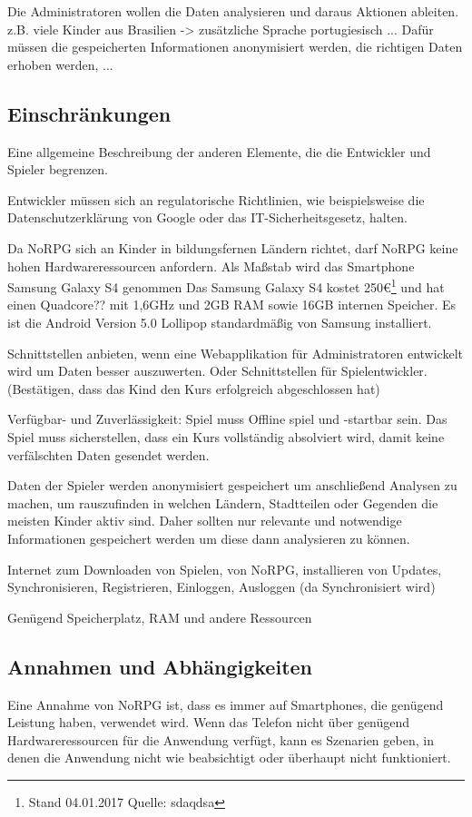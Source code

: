 		Die Administratoren wollen die Daten analysieren und daraus Aktionen ableiten. z.B. viele Kinder aus Brasilien -> zusätzliche Sprache portugiesisch ... Dafür müssen die gespeicherten Informationen anonymisiert werden, die richtigen Daten erhoben werden, ...
			
	\subsection{Einschränkungen}
		Eine allgemeine Beschreibung der anderen Elemente, die die Entwickler und Spieler begrenzen.
		
		Entwickler müssen sich an regulatorische Richtlinien, wie beispielsweise die Datenschutzerklärung von Google oder das IT-Sicherheitsgesetz, halten.
				
		Da NoRPG sich an Kinder in bildungsfernen Ländern richtet, darf NoRPG keine hohen Hardwareressourcen anfordern. Als Maßstab wird das Smartphone Samsung Galaxy S4 genommen %
		Das Samsung Galaxy S4 kostet 250€\footnote{Stand 04.01.2017 Quelle: sdaqdsa} und hat einen Quadcore?? mit 1,6GHz und 2GB RAM sowie 16GB internen Speicher. Es ist die Android Version 5.0 Lollipop standardmäßig von Samsung installiert.
		
		Schnittstellen anbieten, wenn eine Webapplikation für Administratoren entwickelt wird um Daten besser auszuwerten. Oder Schnittstellen für Spielentwickler. (Bestätigen, dass das Kind den Kurs erfolgreich abgeschlossen hat)
				
		Verfügbar- und Zuverlässigkeit: Spiel muss Offline spiel und -startbar sein. Das Spiel muss sicherstellen, dass ein Kurs vollständig absolviert wird, damit keine verfälschten Daten gesendet werden. 

		Daten der Spieler werden anonymisiert gespeichert um anschließend Analysen zu machen, um rauszufinden in welchen Ländern, Stadtteilen oder Gegenden die meisten Kinder aktiv sind. Daher sollten nur relevante und notwendige Informationen gespeichert werden um diese dann analysieren zu können.
		
		Internet zum Downloaden von Spielen, von NoRPG, installieren von Updates, Synchronisieren, Registrieren, Einloggen, Ausloggen (da Synchronisiert wird) 
		
		Genügend Speicherplatz, RAM und andere Ressourcen
				
	\subsection{Annahmen und Abhängigkeiten}
		Eine Annahme von NoRPG ist, dass es immer auf Smartphones, die genügend Leistung haben, verwendet wird. Wenn das Telefon nicht über genügend Hardwareressourcen für die Anwendung verfügt, kann es Szenarien geben, in denen die Anwendung nicht wie beabsichtigt oder überhaupt nicht funktioniert.
		
